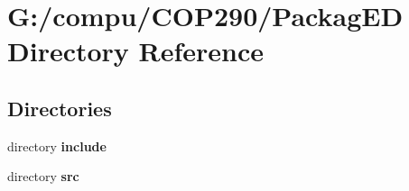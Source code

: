 \section{G\+:/compu/\+C\+O\+P290/\+Packag\+ED Directory Reference}
\label{dir_7249aa5565a4db665453b8bb8fda336e}
\subsection*{Directories}
\begin{DoxyCompactItemize}
\item 
directory \textbf{ include}
\item 
directory \textbf{ src}
\end{DoxyCompactItemize}
